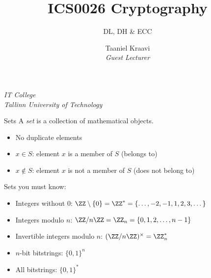

\usepackage{booktabs}

\usepackage{csquotes}

\usepackage{graphicx}
\graphicspath{ {../../images/} }

\usepackage{pgfplots}
\usetikzlibrary{positioning,calc,external}

\usepackage{crysymb}

\renewcommand*{\arraystretch}{1.2}

\usepackage{soul}

\usetikzlibrary{positioning,calc}
\graphicspath{ {../../images/} }

\title[Short version of title]{ICS0026 Cryptography}
\subtitle{DL, DH \& ECC}
\author%
{%
    {Taaniel Kraavi}\\
    \textit{\footnotesize Guest Lecturer}
}
\institute%
{%
    \textit{IT College}\\
    \textit{Tallinn University of Technology}
}


\begin{frame}
  \titlepage
\end{frame}

\begin{frame}{Sets}
  A \emph{set} is a collection of mathematical objects.
  \begin{itemize}[<+(1)->]
    \item No duplicate elements
    \item $x\in S$: element $x$ is a member of $S$ (belongs to)
    \item $x\notin S$: element $x$ is not a member of $S$ (does not belong to)
  \end{itemize}

  \pause
  Sets you must know:
  \begin{itemize}[<+(1)->]
    \item Integers without $0$: $\ZZ\setminus\{0\}=\ZZ^*=\{\dots, -2, -1, 1, 2, 3, \dots\}$
    \item Integers modulo $n$: $\ZZ/n\ZZ = \ZZ_n = \{0, 1, 2, \dots, n-1\}$
    \item Invertible integers modulo $n$: $(\ZZ/n\ZZ)^\times = \ZZ_n^*$
    \item $n$-bit bitstrings: $\{0, 1\}^n$
    \item All bitstrings: $\{0, 1\}^*$
  \end{itemize}
\end{frame}

